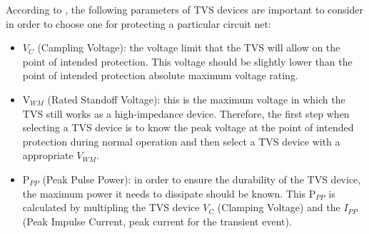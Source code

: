 		\label{ssssec:tvsSelection}
		According to \cite{microSemiSelectTVS}, the following parameters of TVS devices are important to consider in order to choose one for protecting a particular circuit net:

		\begin{itemize}
			\item $V_{C}$ (Campling Voltage): the voltage limit that the TVS will allow on the point of intended protection. This voltage should be slightly lower than the point of intended protection absolute maximum voltage rating.\label{itm:campling-voltage}
			\item V$_{WM}$ (Rated Standoff Voltage): this is the maximum voltage in which the TVS still works as a high-impedance device. Therefore, the first step when selecting a TVS device is to know the peak voltage at the point of intended protection during normal operation and then select a TVS device with a appropriate $V_{WM}$.\label{itm:tvs-standoff-voltage}
			\item P$_{PP}$ (Peak Pulse Power): in order to ensure the durability of the TVS device, the maximum power it needs to dissipate should be known. This P$_{PP}$ is calculated by multipling the TVS device $V_{C}$ (Clamping Voltage) and the $I_{PP}$ (Peak Impulse Current, peak current for the transient event).\label{itm:peak-pulse-power}
		\end{itemize}